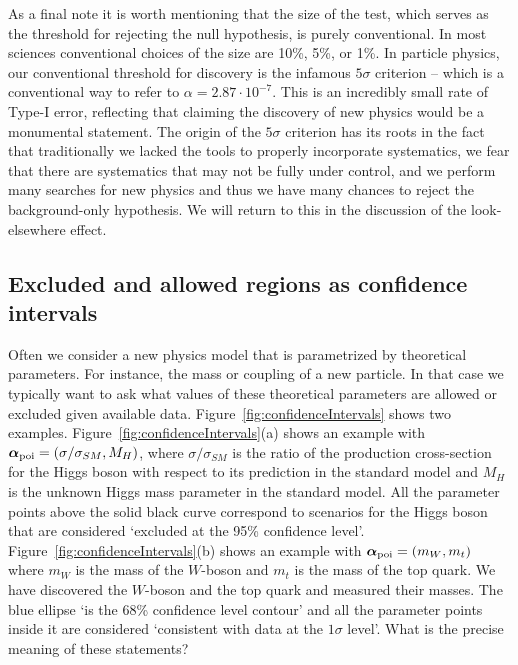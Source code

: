 \documentclass{cernrep}
\def\vec#1{\ifmmode
\mathchoice{\mbox{\boldmath$\displaystyle\bf#1$}}
{\mbox{\boldmath$\textstyle\bf#1$}}
{\mbox{\boldmath$\scriptstyle\bf#1$}}
{\mbox{\boldmath$\scriptscriptstyle\bf#1$}}\else
{\mbox{\boldmath$\bf#1$}}\fi}
\begin{document}
As a final note it is worth mentioning that the size of the test, which serves as the threshold for rejecting the null hypothesis, is purely conventional.  In most sciences conventional choices of the size are 10\%, 5\%, or 1\%.  In particle physics, our conventional threshold for discovery is the infamous $5\sigma$ criterion -- which is a conventional way to refer to $\alpha=2.87 \cdot 10^{-7}$.  This is an incredibly small rate of Type-I error, reflecting that claiming the discovery of new physics would be a monumental statement.  The origin of the $5\sigma$ criterion has its roots in the fact that traditionally we lacked the tools to properly incorporate systematics, we fear that there are systematics that may not be fully under control, and we perform many searches for new physics and thus we have many chances to reject the background-only hypothesis.  We will return to this in the discussion of the look-elsewhere effect. 


\subsection{Excluded and allowed regions as confidence intervals}

Often we consider a new physics model that is parametrized by theoretical parameters.  For instance, the mass or coupling of a new particle.  In that case we typically want to ask what values of these theoretical parameters are allowed or excluded given available data.  Figure~\ref{fig:confidenceIntervals} shows two examples.  Figure~\ref{fig:confidenceIntervals}(a) shows an example with $\vec\alpha_{\rm poi} = (\sigma/\sigma_{SM}, M_H)$, where $\sigma/\sigma_{SM}$ is the ratio of the production cross-section for the Higgs boson with respect to its prediction in the standard model and $M_H$ is the unknown Higgs mass parameter in the standard model.  All the parameter points above the solid black curve correspond to scenarios for the Higgs boson that are considered `excluded at the 95\% confidence level'.  Figure~\ref{fig:confidenceIntervals}(b) shows an example with 
$\vec\alpha_{\rm poi} = (m_W,m_t)$ where $m_W$ is the mass of the $W$-boson and $m_t$ is the mass of the top quark. We have discovered the $W$-boson and the top quark and measured their masses.  The blue ellipse `is the 68\% confidence level contour' and all the parameter points inside it are considered `consistent with data at the $1\sigma$ level'.   What is the precise meaning of these statements?
\end{document}
